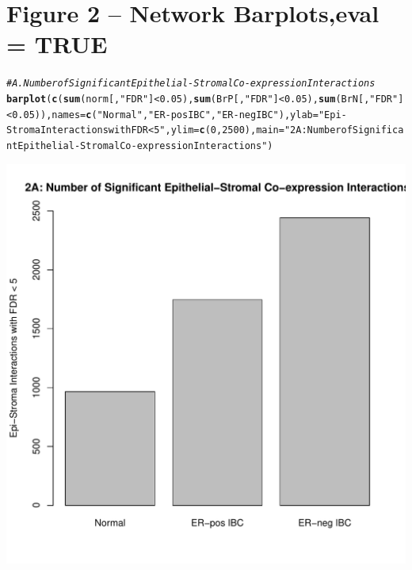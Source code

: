 \documentclass{article}\usepackage[]{graphicx}\usepackage[]{color}
\makeatletter
\def\maxwidth{ %
  \ifdim\Gin@nat@width>\linewidth
    \linewidth
  \else
    \Gin@nat@width
  \fi
}
\newcommand{\hlnum}[1]{\textcolor[rgb]{0.686,0.059,0.569}{#1}}%
\newcommand{\hlstr}[1]{\textcolor[rgb]{0.192,0.494,0.8}{#1}}%
\newcommand{\hlcom}[1]{\textcolor[rgb]{0.678,0.584,0.686}{\textit{#1}}}%
\newcommand{\hlopt}[1]{\textcolor[rgb]{0,0,0}{#1}}%
\newcommand{\hlstd}[1]{\textcolor[rgb]{0.345,0.345,0.345}{#1}}%
\newcommand{\hlkwc}[1]{\textcolor[rgb]{0.333,0.667,0.333}{#1}}%
\newcommand{\hlkwd}[1]{\textcolor[rgb]{0.737,0.353,0.396}{\textbf{#1}}}%
\newenvironment{kframe}{%
 \def\at@end@of@kframe{}%
 \ifinner\ifhmode%
  \def\at@end@of@kframe{\end{minipage}}%
  \begin{minipage}{\columnwidth}%
 \fi\fi%
 \def\FrameCommand##1{\hskip\@totalleftmargin \hskip-\fboxsep
 \colorbox{shadecolor}{##1}\hskip-\fboxsep
     \hskip-\linewidth \hskip-\@totalleftmargin \hskip\columnwidth}%
 \MakeFramed {\advance\hsize-\width
   \@totalleftmargin\z@ \linewidth\hsize
   \@setminipage}}%
 {\par\unskip\endMakeFramed%
 \at@end@of@kframe}
\newenvironment{knitrout}{}{} %
\makeatother
\begin{document}
\section{Figure 2 -- Network Barplots,eval = TRUE}
\begin{knitrout}
\color{fgcolor}\begin{kframe}
\begin{alltt}
\hlcom{# A. Number of Significant Epithelial-Stromal Co-expression Interactions}
\hlkwd{barplot}\hlstd{(}\hlkwd{c}\hlstd{(}\hlkwd{sum}\hlstd{(norm[,}\hlstr{"FDR"}\hlstd{]}\hlopt{<}\hlnum{0.05}\hlstd{),}\hlkwd{sum}\hlstd{(BrP[,}\hlstr{"FDR"}\hlstd{]}\hlopt{<}\hlnum{0.05}\hlstd{),}\hlkwd{sum}\hlstd{(BrN[,}\hlstr{"FDR"}\hlstd{]}\hlopt{<}\hlnum{0.05}\hlstd{)),}\hlkwc{names}\hlstd{=}\hlkwd{c}\hlstd{(}\hlstr{"Normal"}\hlstd{,}\hlstr{"ER-pos IBC"}\hlstd{,}\hlstr{"ER-neg IBC"}\hlstd{),}\hlkwc{ylab}\hlstd{=}\hlstr{"Epi-Stroma Interactions with FDR < 5"}\hlstd{,}\hlkwc{ylim}\hlstd{=}\hlkwd{c}\hlstd{(}\hlnum{0}\hlstd{,}\hlnum{2500}\hlstd{),}\hlkwc{main}\hlstd{=}\hlstr{"2A: Number of Significant Epithelial-Stromal Co-expression Interactions"}\hlstd{)}
\end{alltt}
\end{kframe}
\includegraphics[width=\maxwidth]{figure/Figure_2-1} 
\begin{kframe}\begin{alltt}

\end{alltt}
\end{kframe}
\end{knitrout}
\end{document}

